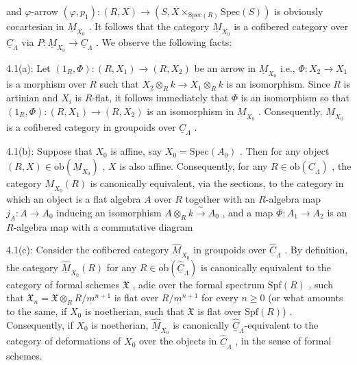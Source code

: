 \begin{center}
\end{center}
and $\varphi$-arrow $(\varphi, p_1) : (R, X) \to (S, X \times_{\mathrm{Spec}(R)} \mathrm{Spec}(S))$ is obviously cocartesian in $\underline{M}_{X_0}$ . It follows that the category $\underline{M}_{X_0}$ is a cofibered category over $\underline{C}_\Lambda$ via $P : \underline{M}_{X_0} \to \underline{C}_\Lambda$ . We observe the following facts:



4.1(a): Let $(1_R, \Phi) : (R, X_1) \to (R, X_2)$ be an arrow in $\underline{M}_{X_0}$ i.e., $\Phi : X_2 \to X_1$ is a morphism over $R$ such that $X_2 \otimes_R k \to X_1 \otimes_R k$ is an isomorphism. Since $R$ is artinian and $X_i$ is $R$-flat, it follows immediately that $\Phi$ is an isomorphism so that $(1_R, \Phi) : (R, X_1) \to (R, X_2)$ is an isomorphism in $\underline{M}_{X_0}$ . Consequently, $\underline{M}_{X_0}$ is a cofibered category in groupoids over $\underline{C}_\Lambda$ .

4.1(b): Suppose that $X_0$ is affine, say $X_0 = \mathrm{Spec}(A_0)$ . Then for any object $(R, X) \in \mathrm{ob}(\underline{M}_{X_0})$ , $X$ is also affine. Consequently, for any $R \in \mathrm{ob}(\underline{C}_\Lambda)$ , the category $\underline{M}_{X_0}(R)$ is canonically equivalent, via the sections, to the category in which an object is a flat algebra $A$ over $R$ together with an $R$-algebra map $j_A : A \to A_0$ inducing an isomorphism $A \otimes_R k \xrightarrow{\ \sim\ } A_0$ , and a map $\Phi : A_1 \to A_2$ is an $R$-algebra map with a commutative diagram

\begin{center}
\end{center}
4.1(c): Consider the cofibered category $\widehat{\underline{M}}_{X_0}$ in groupoids over $\widehat{\underline{C}}_\Lambda$ . By definition, the category $\widehat{\underline{M}}_{X_0}(R)$ for any $R \in \mathrm{ob}(\widehat{\underline{C}}_\Lambda)$ is canonically equivalent to the category of formal schemes $\mathfrak{X}$ , adic over the formal spectrum $\mathrm{Spf}(R)$ , such that $\mathfrak{X}_n = \mathfrak{X} \otimes_R R/\underline{m}^{n+1}$ is flat over $R/\underline{m}^{n+1}$ for every $n \geq 0$ (or what amounts to the same, if $X_0$ is noetherian, such that $\mathfrak{X}$ is flat over $\mathrm{Spf}(R)$) . Consequently, if $X_0$ is noetherian, $\widehat{\underline{M}}_{X_0}$ is canonically $\widehat{\underline{C}}_\Lambda$-equivalent to the category of deformations of $X_0$ over the objects in $\widehat{\underline{C}}_\Lambda$ , in the sense of formal schemes.

